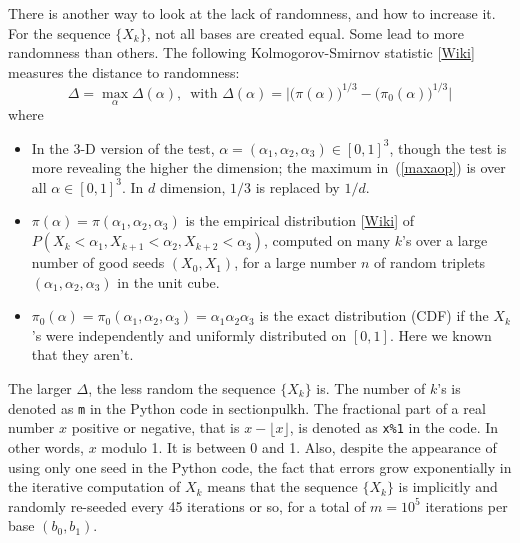 \documentclass[oneside,10pt]{book}
\begin{document}
There is another way to look at the lack of randomness, and how to increase it. For the sequence $\{X_k\}$, not all bases are created equal. Some lead to more randomness than others. The following \textcolor{index}{Kolmogorov-Smirnov statistic} [\href{https://en.wikipedia.org/wiki/Kolmogorov\%E2\%80\%93Smirnov_test}{Wiki}] measures the distance to randomness:
\begin{equation}
\Delta = \max_{\alpha} \Delta(\alpha), \, \text{ with } \Delta(\alpha) = \Bigg|\Big(\pi(\alpha)\Big)^{1/3}-\Big(\pi_0(\alpha)\Big)^{1/3}\Bigg| \label{maxaop}
\end{equation}
where
\begin{itemize}
\item In the 3-D version of the test, $\alpha=(\alpha_1,\alpha_2,\alpha_3) \in [0,1]^3$,
though the test is more revealing the higher the dimension; the maximum in~(\ref{maxaop}) is over all $\alpha \in [0,1]^3$.
 In $d$ dimension, $1/3$ is replaced by $1/d$.
\item $\pi(\alpha)=\pi(\alpha_1,\alpha_2,\alpha_3)$ is the \textcolor{index}{empirical distribution}
[\href{https://en.wikipedia.org/wiki/Empirical_distribution_function}{Wiki}] of $P(X_k<\alpha_1, X_{k+1}<\alpha_2,X_{k+2}<\alpha_3)$,
 computed on many $k$'s over a large number of good seeds $(X_0,X_1)$, for a large number $n$ of random triplets $(\alpha_1,\alpha_2,\alpha_3)$
 in the unit cube.
\item $\pi_0(\alpha)=\pi_0(\alpha_1,\alpha_2,\alpha_3)=\alpha_1\alpha_2\alpha_3$ is the exact distribution (CDF) if the $X_k$'s were independently
 and uniformly distributed on $[0,1]$. Here we known that they aren't.
\end{itemize} \vspace{1ex}
The larger $\Delta$, the less random the sequence $\{X_k\}$ is.
The number of $k$'s is denoted as \texttt{m} in the Python code in section{pulkh}. The fractional part of a real number $x$ positive or negative, that is $x-\lfloor x\rfloor$,
 is denoted as \texttt{x\%1}  in the code. In other words, $x$ modulo 1. It is between 0 and 1. Also, despite the appearance of using only one seed in the Python code, the fact that errors grow exponentially in the iterative computation of  $X_k$ means that
 the sequence $\{X_k\}$ is implicitly and randomly re-seeded every 45 iterations or so, for a total of $m=10^5$ iterations per base $(b_0, b_1)$.
\end{document}
